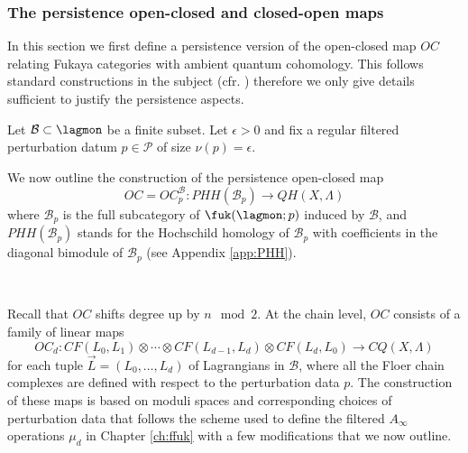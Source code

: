 

\subsubsection{The persistence open-closed and closed-open maps}\label{gio:oc}
In this section we first define a persistence version of the open-closed map $OC$ relating Fukaya categories with ambient quantum cohomology. This  follows standard constructions in the subject  (cfr. \cite{Ab:geom-crit, she:fanofuk}) therefore we only give details sufficient to justify the persistence aspects.


Let $\mathcal{B}\subset \lagmon$ be a finite subset. Let $\epsilon>0$ and fix a regular filtered perturbation datum $p\in \mathcal{P}$ of size $\nu(p)=\epsilon$. 

We now outline the construction of the persistence open-closed map 
\begin{equation}\label{eq:oc_map}
OC=OC^\mathcal{B}_p\colon PHH(\mathcal{B}_p)\to QH(X,\Lambda)
\end{equation} where $\mathcal{B}_p$ is the full subcategory of $\fuk(\lagmon;p)$ induced by $\mathcal{B}$, and $PHH(\mathcal{B}_p)$ stands for the Hochschild homology of $\mathcal{B}_p$ with coefficients in the diagonal bimodule of $\mathcal{B}_p$ (see Appendix \ref{app:PHH}). 

\

Recall that $OC$ shifts degree up by $n \mod 2$. At the chain level, $OC$ consists of a family of linear maps $$OC_d\colon CF(L_0,L_1)\otimes \cdots \otimes CF(L_{d-1},L_d)\otimes CF(L_d,L_0)\to CQ(X,\Lambda) $$ for each tuple $\vec{L}=(L_0,\ldots, L_d)$ of Lagrangians in $\mathcal{B}$, where all the Floer chain complexes are defined with respect to the perturbation data $p$. 
The construction of these maps is based on moduli spaces and corresponding choices of perturbation data that follows the scheme used to define the filtered
$A_{\infty}$ operations $\mu_{d}$ in Chapter \ref{ch:ffuk} with a few modifications that we now outline. 

